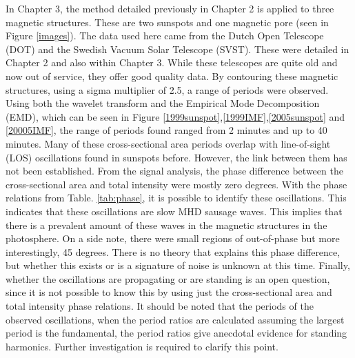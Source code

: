     In Chapter 3, the method detailed previously in Chapter 2 is applied to three magnetic structures.
    These are two sunspots and one magnetic pore (seen in Figure \ref{images}).
    The data used here came from the Dutch Open Telescope (DOT) and the Swedish Vacuum Solar Telescope (SVST). 
    These were detailed in Chapter 2 and also within Chapter 3.
    While these telescopes are quite old and now out of service, they offer good quality data.
    By contouring these magnetic structures, using a sigma multiplier of 2.5, a range of periods were observed.   
    Using both the wavelet transform and the Empirical Mode Decomposition (EMD), which can be seen in Figure \ref{1999sunspot},\ref{1999IMF},\ref{2005sunspot} and \ref{20005IMF}, the range of periods found ranged from 2 minutes and up to 40 minutes. 
    Many of these cross-sectional area periods overlap with line-of-sight (LOS) oscillations found in sunspots before.
    However, the link between them has not been established.
    From the signal analysis, the phase difference between the cross-sectional area and total intensity were mostly zero degrees.
    With the phase relations from Table. \ref{tab:phase}, it is possible to identify these oscillations.
    This indicates that these oscillations are slow MHD sausage waves.
    This implies that there is a prevalent amount of these waves in the magnetic structures in the photosphere.
    On a side note, there were small regions of out-of-phase but more interestingly, 45 degrees.
    There is no theory that explains this phase difference, but whether this exists or is a signature of noise is unknown at this time.
    Finally, whether the oscillations are propagating or are standing is an open question, since it is not possible to know this by using just the cross-sectional area and total intensity phase relations.    
    It should be noted that the periods of the observed oscillations, when the period ratios are calculated assuming the largest period is the fundamental, the period ratios give anecdotal evidence for standing harmonics.
    Further investigation is required to clarify this point.
    

